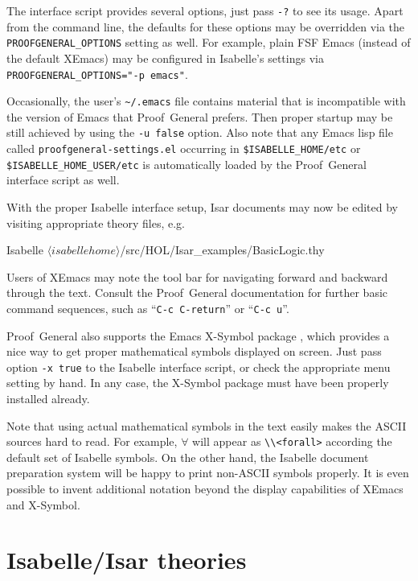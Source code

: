 The interface script provides several options, just pass \verb,-?, to see its
usage.  Apart from the command line, the defaults for these options may be
overridden via the \texttt{PROOFGENERAL_OPTIONS} setting as well.  For
example, plain FSF Emacs (instead of the default XEmacs) may be configured in
Isabelle's settings via \texttt{PROOFGENERAL_OPTIONS="-p emacs"}.

Occasionally, the user's \verb,~/.emacs, file contains material that is
incompatible with the version of Emacs that Proof~General prefers.  Then
proper startup may be still achieved by using the \texttt{-u false} option.
Also note that any Emacs lisp file called \texttt{proofgeneral-settings.el}
occurring in \texttt{\$ISABELLE_HOME/etc} or \texttt{\$ISABELLE_HOME_USER/etc}
is automatically loaded by the Proof~General interface script as well.

\medskip

With the proper Isabelle interface setup, Isar documents may now be edited by
visiting appropriate theory files, e.g.\ 
\begin{ttbox}
Isabelle \({\langle}isabellehome{\rangle}\)/src/HOL/Isar_examples/BasicLogic.thy
\end{ttbox}
Users of XEmacs may note the tool bar for navigating forward and backward
through the text.  Consult the Proof~General documentation \cite{proofgeneral}
for further basic command sequences, such as ``\texttt{C-c C-return}'' or
``\texttt{C-c u}''.

\medskip

Proof~General also supports the Emacs X-Symbol package \cite{x-symbol}, which
provides a nice way to get proper mathematical symbols displayed on screen.
Just pass option \texttt{-x true} to the Isabelle interface script, or check
the appropriate menu setting by hand.  In any case, the X-Symbol package must
have been properly installed already.

Note that using actual mathematical symbols in the text easily makes the ASCII
sources hard to read.  For example, $\forall$ will appear as \verb,\\<forall>,
according the default set of Isabelle symbols.  On the other hand, the
Isabelle document preparation system \cite{isabelle-sys} will be happy to
print non-ASCII symbols properly.  It is even possible to invent additional
notation beyond the display capabilities of XEmacs and X-Symbol.


\section{Isabelle/Isar theories}

